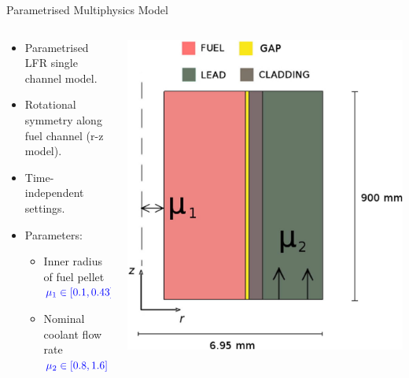 \documentclass{beamer}
\makeatletter
\def\mathcolor#1#{\@mathcolor{#1}}
\def\@mathcolor#1#2#3{%
  \protect\leavevmode
  \begingroup
    \color#1{#2}#3%
  \endgroup
}
\makeatother
\begin{document}
\begin{frame}{Parametrised Multiphysics Model}
    \begin{columns}
        \begin{column}{0.5\textwidth}
            \begin{itemize}
                \item Parametrised LFR single channel model.
                \item Rotational symmetry along fuel channel (r-z model).
                \item Time-independent settings.
                \item Parameters:
                    \begin{itemize}
                        \item Inner radius of fuel pellet $\mathcolor{blue}{\mu_1 \in [0.1, 0.43]} \text{ (cm)}$
                        \item Nominal coolant flow rate $\mathcolor{blue}{\mu_2 \in [0.8, 1.6]} \text{ (m/s)}$
                    \end{itemize}
            \end{itemize}
        \end{column}
        \begin{column}{0.5\textwidth} 
            \begin{center}
            \includegraphics[width=\textwidth]{Parametric.jpg}
            \end{center}
        \end{column}
    \end{columns}
\end{frame}
\end{document}
